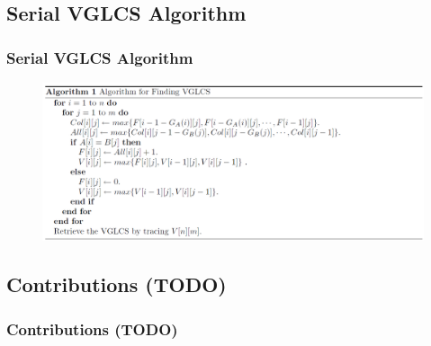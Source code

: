 \subsection{Serial VGLCS Algorithm}
\begin{frame}
    \frametitle{Serial VGLCS Algorithm}
    \begin{figure}
        \includegraphics[scale=0.3]{figure/fig-VGLCS-algo.png}
    \end{figure}
\end{frame}

\subsection{Contributions (TODO)}
\begin{frame}
    \frametitle{Contributions (TODO)}
\end{frame}
